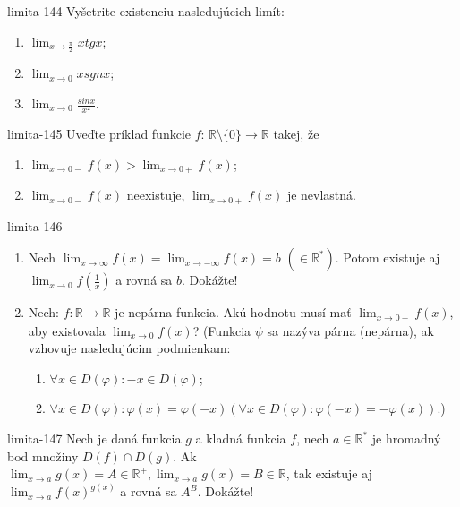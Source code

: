 \begin{defproblem}{limita-144}
Vyšetrite existenciu nasledujúcich limít:
\begin{enumerate}
\item $\lim_{x \rightarrow \frac{\pi}{2}} x tg x$;
\item $\lim_{x \rightarrow 0} x sgn x$;
\item $\lim_{x \rightarrow 0} \frac{sin x}{x^2}$.
\end{enumerate}
\end{defproblem}

\begin{defproblem}{limita-145}
Uveďte príklad funkcie $f$: $\mathbb{R} \setminus \{ 0\} \rightarrow \mathbb{R}$ takej, že
\begin{enumerate}
\item $\lim_{x \rightarrow 0-} f(x)>\lim_{x \rightarrow 0+} f(x)$;
\item $\lim_{x \rightarrow 0-} f(x)$ neexistuje, $\lim_{x \rightarrow 0+} f(x)$ je nevlastná.
\end{enumerate}
\end{defproblem}

\begin{defproblem}{limita-146}
\begin{enumerate}
\item Nech $\lim_{x \rightarrow \infty} f(x)=\lim_{x \rightarrow -\infty} f(x)=b$  $(\in \mathbb{R^*})$. Potom existuje aj $\lim_{x \rightarrow 0} f(\frac{1}{x})$  a rovná sa $b$. Dokážte!
\item Nech: $f: \mathbb{R} \rightarrow \mathbb{R}$ je nepárna funkcia. Akú hodnotu musí mať $\lim_{x \rightarrow 0+} f(x)$, aby existovala $\lim_{x \rightarrow 0} f(x)$? (Funkcia $\psi$ sa nazýva párna (nepárna), ak vzhovuje nasledujúcim podmienkam:
\begin{enumerate}
\item $\forall x \in D(\varphi): -x \in D(\varphi)$;
\item $\forall x \in D(\varphi): \varphi(x)=\varphi(-x) (\forall x \in D(\varphi): \varphi(-x)=-\varphi(x))$.)
\end{enumerate}
\end{enumerate}
\end{defproblem}

\begin{defproblem}{limita-147}
Nech je daná funkcia $g$ a kladná funkcia $f$, nech $a \in \mathbb{R^*}$ je hromadný bod množiny $D(f)\cap D(g)$. Ak $\lim_{x \rightarrow a} g(x)=A \in \mathbb{R^+},\lim_{x \rightarrow a} g(x)=B \in \mathbb{R}$, tak existuje aj $\lim_{x \rightarrow a} f(x)^{g(x)}$ a rovná sa $A^B$. Dokážte!
\end{defproblem}

